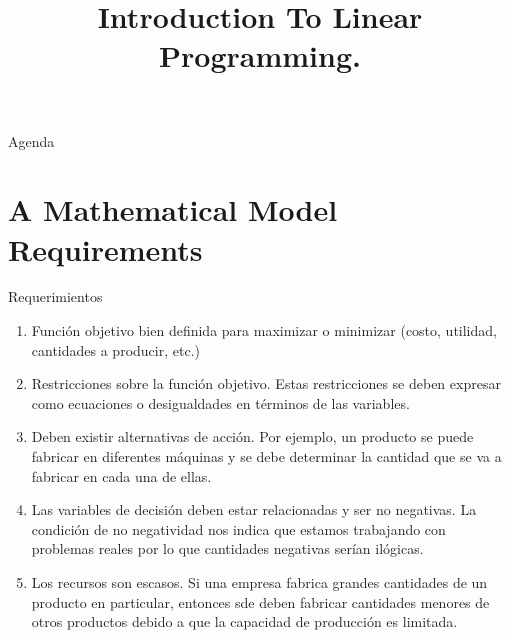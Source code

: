 \documentclass[../slides.tex]{subfiles}
\title{Introduction To Linear Programming.}
\begin{document}
\begin{frame}
  \maketitle
\end{frame}


     \begin{frame}{Agenda}
   \tableofcontents
 \end{frame}



\section{A Mathematical Model Requirements}
\label{sec:formulations}

\begin{frame}{Requerimientos}
  \begin{enumerate} \parskip2mm \justifying
  \item<only@1> Función objetivo bien definida para maximizar o minimizar (costo, utilidad, cantidades a producir, etc.) 
  \item<only@1> Restricciones sobre la función objetivo. Estas restricciones se deben expresar como ecuaciones o desigualdades en términos de las variables.
  \item<only@1> Deben existir alternativas de acción. Por ejemplo, un producto se puede fabricar en diferentes máquinas y se debe determinar la cantidad que se va a fabricar en cada una de ellas. 
  \item<only@2> Las variables de decisión deben estar relacionadas y ser no negativas. La condición de no negatividad nos indica que estamos trabajando con problemas reales por lo que cantidades negativas serían ilógicas.
  \item<only@2> Los recursos son escasos. Si una empresa fabrica grandes cantidades de un producto en particular, entonces sde deben fabricar cantidades menores de otros productos debido a que la capacidad de producción es limitada.
  \end{enumerate}
\end{frame}
\end{document}
